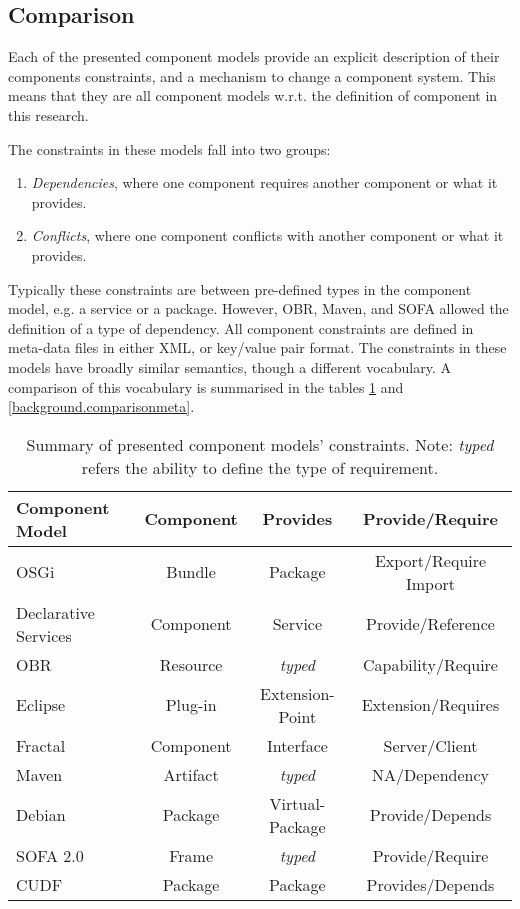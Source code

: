\subsection{Comparison}
Each of the presented component models provide an explicit description of their components constraints, and a mechanism to change a component system.
This means that they are all component models w.r.t. the definition of component in this research.

The constraints in these models fall into two groups:
\begin{enumerate}
  \item \textit{Dependencies}, where one component requires another component or what it provides.
  \item \textit{Conflicts}, where one component conflicts with another component or what it provides. 
\end{enumerate} 
Typically these constraints are between pre-defined types in the component model, e.g. a service or a package.
However, OBR, Maven, and SOFA allowed the definition of a type of dependency. 
All component constraints are defined in meta-data files in either XML, or key/value pair format.
The constraints in these models have broadly similar semantics, though a different vocabulary.
A comparison of this vocabulary is summarised in the tables  \ref{background.comparisonrel} and \ref{background.comparisonmeta}.  

\begin{table}[h!]
\begin{tabular}{|l || c | c | c | }
\hline \textbf{Component Model}& \textbf{Component}& \textbf{Provides}	& \textbf{Provide/Require}\\ \hline

OSGi					& Bundle			& Package 					& Export/Require Import \\
Declarative Services	& Component			& Service 					& Provide/Reference\\
OBR						& Resource			& \textit{typed}			& Capability/Require\\
Eclipse					& Plug-in			& Extension-Point			& Extension/Requires\\
Fractal					& Component			& Interface 				& Server/Client\\
Maven					& Artifact			& \textit{typed} 			& NA/Dependency\\
Debian					& Package			& Virtual-Package 			& Provide/Depends\\
SOFA 2.0				& Frame				& \textit{typed} 			& Provide/Require\\
CUDF					& Package			& Package 					& Provides/Depends\\\hline
\end{tabular}
\caption[Summary of presented component models' constraints.]{Summary of presented component models' constraints. Note: \textit{typed} refers the ability to define the type of requirement.}
\label{background.comparisonrel}
\end{table}


